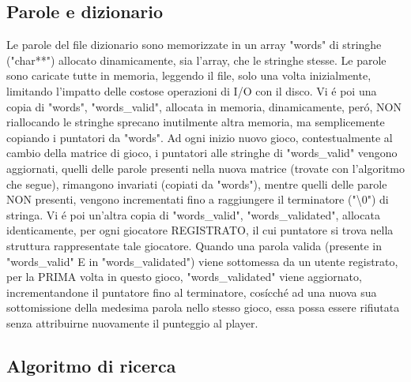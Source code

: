 \subsection{Parole e dizionario}

Le parole del file dizionario sono memorizzate in un array "words" di stringhe ("char**") allocato dinamicamente, sia l'array, che le stringhe stesse. Le parole sono caricate tutte in memoria, leggendo il file, solo una volta inizialmente, limitando l'impatto delle costose operazioni di I/O con il disco. Vi \'e poi una copia di "words", "words\_valid", allocata in memoria, dinamicamente, per\'o, NON riallocando le stringhe sprecano inutilmente altra memoria, ma semplicemente copiando i puntatori da "words". Ad ogni inizio nuovo gioco, contestualmente al cambio della matrice di gioco, i puntatori alle stringhe di "words\_valid" vengono aggiornati, quelli delle parole presenti nella nuova matrice (trovate con l'algoritmo che segue), rimangono invariati (copiati da "words"), mentre quelli delle parole NON presenti, vengono incrementati fino a raggiungere il terminatore ("\textbackslash0") di stringa. Vi \'e poi un'altra copia di "words\_valid", "words\_validated", allocata identicamente, per ogni giocatore REGISTRATO, il cui puntatore si trova nella struttura rappresentate tale giocatore. Quando una parola valida (presente in "words\_valid" E in "words\_validated") viene sottomessa da un utente registrato, per la PRIMA volta in questo gioco, "words\_validated" viene aggiornato, incrementandone il puntatore fino al terminatore, cos\'icch\'e ad una nuova sua sottomissione della medesima parola nello stesso gioco, essa possa essere rifiutata senza attribuirne nuovamente il punteggio al player.
\\

\subsection{Algoritmo di ricerca}

